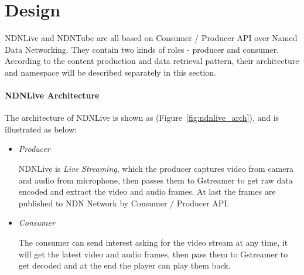 \vspace{0.3cm}
\section{Design} %
\label{sec:arch}
NDNLive and NDNTube are all based on Consumer / Producer API over Named Data Networking. They contain two kinds of roles - producer and consumer. According to the content production and data retrieval pattern, their architecture and namespace will be described separately in this section. 

\paragraph{NDNLive Architecture} %
\vspace{0.3cm}
\label{par:ndnlive_arch}
The architecture of NDNLive is shown as (Figure~\ref{fig:ndnlive_arch}), and is illustrated as below:

\begin{itemize}
  \item \textit{Producer}

  NDNLive is \textit{Live Streaming}, which the producer captures video from camera and audio from microphone, then passes them to Gstreamer to get raw data encoded and extract the video and audio frames. At last the frames are published to NDN Network by Consumer / Producer API. 

  \item \textit{Consumer}

  The consumer can send interest asking for the video stream at any time, it will get the latest video and audio frames, then pass them to Gstreamer to get decoded and at the end the player can play them back. 

\end{itemize}



